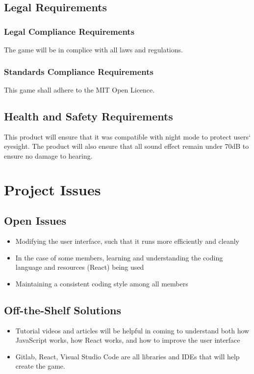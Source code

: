 \documentclass[12pt, titlepage]{article}
\begin{document}
\subsection{Legal Requirements}
\subsubsection{Legal Compliance Requirements}
The game will be in complice with all laws and regulations.
\subsubsection{Standards Compliance Requirements}
This game shall adhere to the MIT Open Licence.

\subsection{Health and Safety Requirements}
This product will ensure that it was compatible with night mode to protect users` eyesight. The product will also ensure that all sound effect remain under 70dB to ensure no damage to hearing. 

\section{Project Issues}

\subsection{Open Issues}
\begin{itemize}
    \item Modifying the user interface, such that it runs more efficiently and cleanly
    \item In the case of some members, learning and understanding the coding language and resources (React) being used
    \item Maintaining a consistent coding style among all members
\end{itemize}

\subsection{Off-the-Shelf Solutions}
\begin{itemize}
    \item Tutorial videos and articles will be helpful in coming to understand both how JavaScript works, how React works, and how to improve the user interface
    \item Gitlab, React, Visual Studio Code are all libraries and IDEs that will help create the game. 
\end{itemize}
\end{document}
